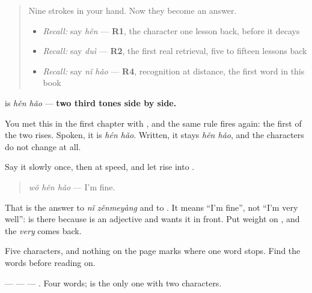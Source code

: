 \label{lesson:ZH-C30-henhao}



\begin{quote}
Nine strokes in your hand. Now they become an answer.

\begin{itemize}
\raggedright
  \item \emph{Recall:} say \emph{hěn} — \textbf{R1}, the character one lesson back, before it decays
  \item \emph{Recall:} say \emph{duì} — \textbf{R2}, the first real retrieval, five to fifteen lessons back
  \item \emph{Recall:} say \emph{nǐ hǎo} — \textbf{R4}, recognition at distance, the first word in this book
\end{itemize}
\end{quote}

\begin{sounds}
\textbf{} is \emph{hěn hǎo} — \textbf{two third tones side by side.}

You met this in the first chapter with , and the same rule fires again: the first of the two rises. Spoken, it is \emph{hén hǎo}. Written, it stays \emph{hěn hǎo}, and the characters do not change at all.

Say it slowly once, then at speed, and let  rise into .
\end{sounds}

\begin{culture}
\begin{quote}
\textbf{} \emph{wǒ hěn hǎo} — I'm fine.
\end{quote}

That is the answer to \emph{nǐ zěnmeyàng} and to . It means \textquotedblleft{}I'm fine\textquotedblright{}, not \textquotedblleft{}I'm very well\textquotedblright{}:  is there because  is an adjective and wants it in front. Put weight on , and the \emph{very} comes back.
\end{culture}

\begin{tcolorbox}[breakable,skin=enhanced,colback=orange!6,colframe=orange!45!black,boxrule=0.5pt,arc=1mm,left=6pt,right=6pt,top=4pt,bottom=4pt,fonttitle=\bfseries,title={Read this}]
\begin{quote}
\end{quote}

Five characters, and nothing on the page marks where one word stops. Find the words before reading on.

 —  —  — . Four words;  is the only one with two characters.
\end{tcolorbox}

